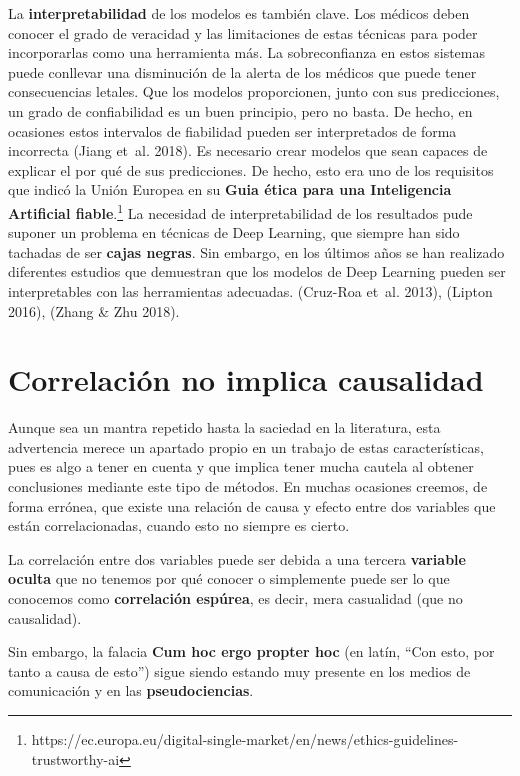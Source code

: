 \documentclass[
  12pt,
  spanish,
  a4paperpaper,
]{report}
\begin{document}
La \textbf{interpretabilidad} de los modelos es también clave. Los
médicos deben conocer el grado de veracidad y las limitaciones de estas
técnicas para poder incorporarlas como una herramienta más. La
sobreconfianza en estos sistemas puede conllevar una disminución de la
alerta de los médicos que puede tener consecuencias letales. Que los
modelos proporcionen, junto con sus predicciones, un grado de
confiabilidad es un buen principio, pero no basta. De hecho, en
ocasiones estos intervalos de fiabilidad pueden ser interpretados de
forma incorrecta (Jiang et~al. 2018). Es necesario crear modelos que
sean capaces de explicar el por qué de sus predicciones. De hecho, esto
era uno de los requisitos que indicó la Unión Europea en su \textbf{Guia
ética para una Inteligencia Artificial fiable}.\footnote{https://ec.europa.eu/digital-single-market/en/news/ethics-guidelines-trustworthy-ai}
La necesidad de interpretabilidad de los resultados pude suponer un
problema en técnicas de Deep Learning, que siempre han sido tachadas de
ser \textbf{cajas negras}. Sin embargo, en los últimos años se han
realizado diferentes estudios que demuestran que los modelos de Deep
Learning pueden ser interpretables con las herramientas adecuadas.
(Cruz-Roa et~al. 2013), (Lipton 2016), (Zhang \& Zhu 2018).

\hypertarget{correlaciuxf3n-no-implica-causalidad}{%
\section{Correlación no implica
causalidad}\label{correlaciuxf3n-no-implica-causalidad}}

Aunque sea un mantra repetido hasta la saciedad en la literatura, esta
advertencia merece un apartado propio en un trabajo de estas
características, pues es algo a tener en cuenta y que implica tener
mucha cautela al obtener conclusiones mediante este tipo de métodos. En
muchas ocasiones creemos, de forma errónea, que existe una relación de
causa y efecto entre dos variables que están correlacionadas, cuando
esto no siempre es cierto.

La correlación entre dos variables puede ser debida a una tercera
\textbf{variable oculta} que no tenemos por qué conocer o simplemente
puede ser lo que conocemos como \textbf{correlación espúrea}, es decir,
mera casualidad (que no causalidad).

Sin embargo, la falacia \textbf{Cum hoc ergo propter hoc} (en latín,
``Con esto, por tanto a causa de esto'') sigue siendo estando muy
presente en los medios de comunicación y en las \textbf{pseudociencias}.
\end{document}
